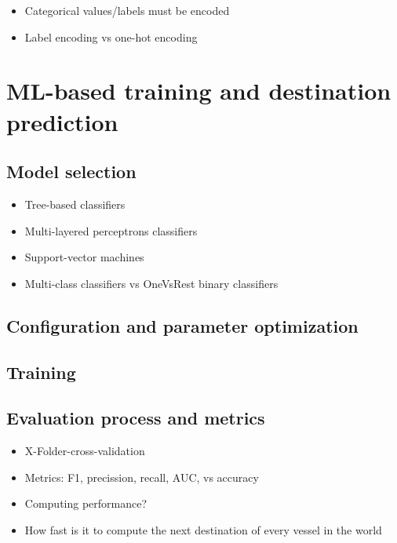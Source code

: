 \begin{itemize}
    \item Categorical values/labels must be encoded
    \item Label encoding vs one-hot encoding
\end{itemize}

\section{ML-based training and destination prediction}

\subsection{Model selection}

\begin{itemize}
    \item Tree-based classifiers
    \item Multi-layered perceptrons classifiers
    \item Support-vector machines
    \item Multi-class classifiers vs OneVsRest binary classifiers
\end{itemize}

\subsection{Configuration and parameter optimization}

\subsection{Training}

\subsection{Evaluation process and metrics}

\begin{itemize}
    \item X-Folder-cross-validation
    \item Metrics: F1, precission, recall, AUC, vs accuracy
    \item Computing performance?
    \item How fast is it to compute the next destination of every vessel in the world
\end{itemize}
